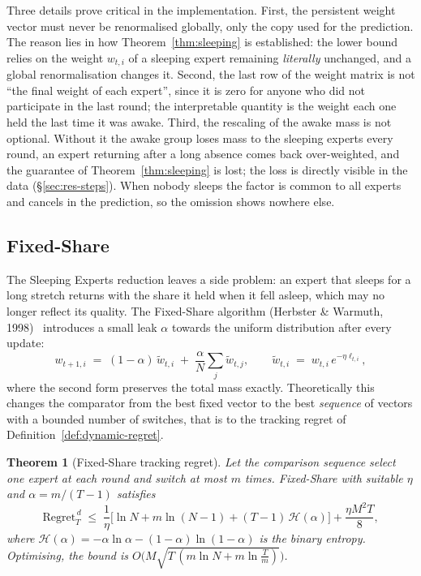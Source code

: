 \documentclass[12pt,a4paper,oneside]{report}
\renewcommand{\_}{\oldunderscore\allowbreak}
\theoremstyle{definition}
\theoremstyle{plain}
\newtheorem{theorem}{Theorem}[chapter]
\theoremstyle{definition}   %
\begin{document}
Three details prove critical in the implementation. First, the persistent weight vector must
never be renormalised globally, only the copy used for the prediction. The reason lies in how
Theorem~\ref{thm:sleeping} is established: the lower bound relies on the weight $w_{t,i}$ of a
sleeping expert remaining
\emph{literally} unchanged, and a global renormalisation changes it. Second, the last row of
the weight matrix is not ``the final weight of each expert'', since it is zero for anyone who
did not participate in the last round; the interpretable quantity is the weight each one held
the last time it was awake. Third, the rescaling of the awake mass is not optional. Without it
the awake group loses mass to the sleeping experts every round, an expert returning after a
long absence comes back over-weighted, and the guarantee of Theorem~\ref{thm:sleeping} is lost;
the loss is directly visible in the data (\S\ref{sec:res-steps}). When nobody sleeps the factor
is common to all experts and cancels in the prediction, so the omission shows nowhere else.

\subsection{Fixed-Share}
\label{sec:fixed-share}

The Sleeping Experts reduction leaves a side problem: an expert that sleeps for a long stretch
returns with the share it held when it fell asleep, which may no longer reflect its quality. The
Fixed-Share algorithm (Herbster \& Warmuth,
1998)~\cite{herbster1998} introduces a small leak $\alpha$ towards the uniform distribution after every update:
\[
w_{t+1,i} \;=\; (1-\alpha)\,\tilde{w}_{t,i} \;+\; \frac{\alpha}{N}\sum_{j} \tilde{w}_{t,j},
\qquad \tilde{w}_{t,i} \;=\; w_{t,i}\,e^{-\eta \ell_{t,i}},
\]
where the second form preserves the total mass exactly. Theoretically this changes the
comparator from the best fixed vector to the best \emph{sequence} of vectors with a bounded
number of switches, that is to the tracking regret of
Definition~\ref{def:dynamic-regret}.

\begin{theorem}[Fixed-Share tracking regret]
\label{thm:fixed-share}
Let the comparison sequence select one expert at each round and switch at most $m$ times.
Fixed-Share with suitable $\eta$ and $\alpha = m/(T-1)$ satisfies
\[
\mathrm{Regret}_T^{\,d} \;\leq\; \frac{1}{\eta}\Big[ \ln N + m \ln(N-1)
+ (T-1)\,\mathcal{H}(\alpha) \Big] + \frac{\eta M^2 T}{8},
\]
where $\mathcal{H}(\alpha) = -\alpha\ln\alpha - (1-\alpha)\ln(1-\alpha)$ is the binary entropy.
Optimising, the bound is $O\big(M\sqrt{T\,(m\ln N + m\ln\frac{T}{m})}\big)$.
\end{theorem}
\end{document}
